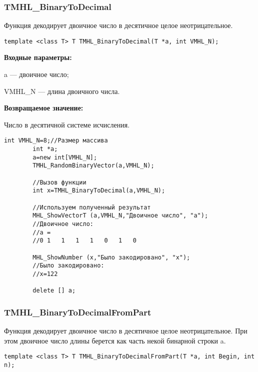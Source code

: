 \documentclass[a4paper,12pt]{article}
\begin{document}
\subsubsection{TMHL\_BinaryToDecimal}\label{TMHL_BinaryToDecimal}

Функция декодирует двоичное число в десятичное целое неотрицательное.


\begin{lstlisting}[label=code_syntax_TMHL_BinaryToDecimal,caption=Синтаксис]
template <class T> T TMHL_BinaryToDecimal(T *a, int VMHL_N);
\end{lstlisting}

\textbf{Входные параметры:}
 
 a --- двоичное число;
 
 VMHL\_N --- длина двоичного числа.
 
\textbf{Возвращаемое значение:}

 Число в десятичной системе исчисления.


\begin{lstlisting}[label=code_use_TMHL_BinaryToDecimal,caption=Пример использования]
        int VMHL_N=8;//Размер массива
        int *a;
        a=new int[VMHL_N];
        TMHL_RandomBinaryVector(a,VMHL_N);

        //Вызов функции
        int x=TMHL_BinaryToDecimal(a,VMHL_N);

        //Используем полученный результат
        MHL_ShowVectorT (a,VMHL_N,"Двоичное число", "a");
        //Двоичное число:
        //a =
        //0	1	1	1	1	0	1	0

        MHL_ShowNumber (x,"Было закодировано", "x");
        //Было закодировано:
        //x=122

        delete [] a;
\end{lstlisting}

\subsubsection{TMHL\_BinaryToDecimalFromPart}\label{TMHL_BinaryToDecimalFromPart}

Функция декодирует двоичное число в десятичное целое неотрицательное. При этом двоичное число длины  берется как часть некой бинарной строки a.


\begin{lstlisting}[label=code_syntax_TMHL_BinaryToDecimalFromPart,caption=Синтаксис]
template <class T> T TMHL_BinaryToDecimalFromPart(T *a, int Begin, int n);
\end{lstlisting}
\end{document}
